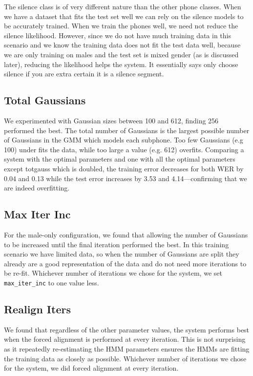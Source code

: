 \documentclass[11pt]{article}
\begin{document}
The silence class is of very different nature than the other phone classes.
When we have a dataset that fits the test set well we can rely on the silence
models to be accurately trained.  When we train the phones well, we  need not
reduce the silence likelihood. However, since we do not have much training
data in this scenario and we know the training data does not fit the test data
well, because we are only training on males and the test set is mixed gender
(as is discussed later), reducing the likelihood helps the system. It
essentially says only choose silence if you are extra certain it is a silence
segment.

\subsection{Total Gaussians}
We experimented with Gaussian sizes between 100 and 612, finding 256 performed
the best. The total number of Gaussians is the largest possible number of
Gaussians in the GMM which models each subphone. Too few Gaussians (e.g 100)
under fits the data, while too large a value (e.g. 612) overfits. Comparing a
system with the optimal parameters and one with all the optimal parameters
except totgauss which is doubled, the training error decreases for both WER by
0.04 and 0.13 while the test error increases by 3.53 and 4.14---confirming
that we are indeed overfitting.

\subsection{Max Iter Inc}
For the male-only configuration, we found that allowing the number of
Gaussians to be increased until the final iteration performed the best. In
this training scenario we have limited data, so when the number of Gaussians
are split they already are a good representation of the data and do not need
more iterations to be re-fit. Whichever number of iterations we chose for the
system, we set \texttt{max\_iter\_inc} to one value less.

\subsection{Realign Iters}
We found that regardless of the other parameter values, the system performs
best when the forced alignment is performed at every iteration. This is not
surprising as it repeatedly re-estimating the HMM parameters ensures the HMMs
are fitting the training data as closely as possible. Whichever number of
iterations we chose for the system, we did forced alignment at every
iteration.
\end{document}
